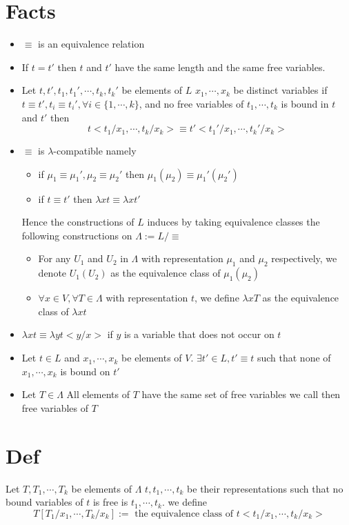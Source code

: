 \documentclass{book}
\begin{document}
\section{Facts}
\begin{itemize}
    \item $\equiv$ is an equivalence relation
    \item If $t=t'$ then $t$ and $t'$ have the same length and the same free variables.
    \item Let $t,t',t_1,t_1',\cdots,t_k,t_k'$ be elements of $L$ $x_1,\cdots,x_k$ be distinct variables if $t\equiv t',t_i\equiv t_i',\forall i\in \{1,\cdots,k\}$, and no free variables of $t_1,\cdots,t_k$ is bound in $t$ and $t'$ then $$t<t_1/x_1,\cdots,t_k/x_k>\equiv t'<t_1'/x_1,\cdots,t_k'/x_k>$$
    \item $\equiv$ is $\lambda$-compatible namely\begin{itemize}
        \item if $\mu_1\equiv\mu_1',\mu_2\equiv\mu_2'$ then $\mu_1(\mu_2)\equiv\mu_1'(\mu_2')$
        \item if $t\equiv t'$ then $\lambda x t\equiv \lambda x t'$
    \end{itemize}
    Hence the constructions of $L$ induces by taking equivalence classes the following constructions on $\Lambda:=L/\equiv$\begin{itemize}
        \item For any $U_1$ and $U_2$ in $\Lambda$ with representation $\mu_1$ and $\mu_2$ respectively, we denote $U_1(U_2)$ as the equivalence class of $\mu_1(\mu_2)$
        \item $\forall x\in V,\forall T\in \Lambda$ with representation $t$, we define $\lambda xT$ as the equivalence class of $\lambda x t$
    \end{itemize}
    \item $\lambda xt\equiv\lambda yt<y/x>$ if $y$ is a variable that does not occur on $t$
    \item Let $t\in L$ and $x_1,\cdots,x_k$ be elements of $V$. $\exists t'\in L, t'\equiv t$ such that none of $x_1,\cdots,x_k$ is bound on $t'$
    \item Let $T\in \Lambda$ All elements of $T$ have the same set of free variables we call then free variables of $T$
\end{itemize}
\section{Def}
Let $T,T_1,\cdots,T_k$ be elements of $\Lambda$ $t,t_1,\cdots,t_k$ be their representations such that no bound variables of $t$ is free is $t_1,\cdots,t_k$. we define
$$T[T_1/x_1,\cdots,T_k/x_k]:=\text{ the equivalence class of } t<t_1/x_1,\cdots,t_k/x_k>$$
\end{document}
